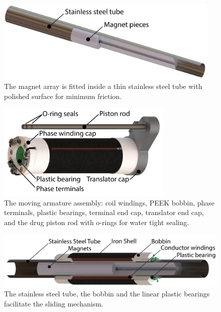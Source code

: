     
    \begin{figure}[h]
        \centering
        \includegraphics[width=4.2in]{chap5/images_concept/magnet_stainlessSteelTube.pdf}
        \caption{The magnet array is fitted inside a thin stainless steel tube with polished surface for minimum friction.}
        \label{fig:chap/experiment/design concept/magnet_stainlessSteelTube}
    \end{figure}
    
    
    \begin{figure}[h]
        \centering
        \includegraphics[width=3.3in]{chap5/images_concept/bobbin_iron_coil_piston.pdf}
        \caption{The moving armature assembly: coil windings, PEEK bobbin, phase terminals, plastic bearings, terminal end cap, translator end cap, and the drug piston rod with o-rings for water tight sealing.}
        \label{fig:chap/experiment/design concept/bobbin_iron_coil_piston.pdf}
    \end{figure}
    
    
    \begin{figure}[h]
        \centering
        \includegraphics[width=5in]{chap5/images_concept/moving_mechanism.pdf}
        \caption{The stainless steel tube, the bobbin and the linear plastic bearings facilitate the sliding mechanism.}
        \label{fig:chap/experiment/design concept/moving_mechanism.pdf}
    \end{figure}
    
